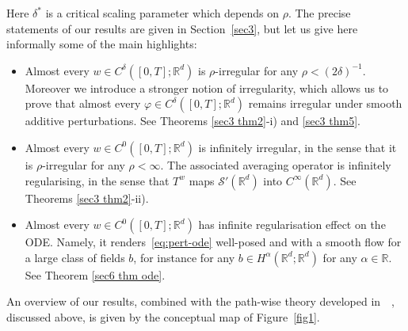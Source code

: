 \documentclass[10pt]{article}
\begin{document}
Here $\delta^{\ast}$ is a critical scaling parameter which depends on $\rho$.
The precise statements of our results are given in Section~\ref{sec3}, but let
us give here informally some of the main highlights:
\begin{itemize}
  \item Almost every $w \in C^{\delta} ([0, T] ; \mathbb{R}^d)$ is
  $\rho$-irregular for any $\rho < (2 \delta)^{- 1}$. Moreover we introduce a
  stronger notion of irregularity, which allows us to prove that almost every
  $\varphi \in C^{\delta} ([0, T] ; \mathbb{R}^d)$ remains irregular under
  smooth additive perturbations. See Theorems \ref{sec3 thm2}-i) and \ref{sec3 thm5}.
  
  \item Almost every $w \in C^0 ([0, T] ; \mathbb{R}^d)$ is infinitely
  irregular, in the sense that it is $\rho$-irregular for any $\rho < \infty$.
  The associated averaging operator is infinitely regularising, in the sense
  that $T^w$ maps $\mathcal{S}' (\mathbb{R}^d)$ into $C^{\infty}
  (\mathbb{R}^d)$. See Theorems \ref{sec3 thm2}-ii).
  
  \item Almost every $w \in C^0 ([0, T] ; \mathbb{R}^d)$ has infinite
  regularisation effect on the ODE. Namely, it renders~\eqref{eq:pert-ode}
  well-posed and with a smooth flow for a large class of fields $b$, for
  instance for any $b \in H^{\alpha} (\mathbb{R}^d ; \mathbb{R}^d)$ for any
  $\alpha \in \mathbb{R}$. See Theorem \ref{sec6 thm ode}.
\end{itemize}
An overview of our results, combined with the path-wise theory developed
in~{\cite{catelliergubinelli}}~{\cite{choukgubinelli1}},
{\cite{choukgubinelli2}} discussed above, is given by the conceptual map of
Figure~\ref{fig1}.
\end{document}
